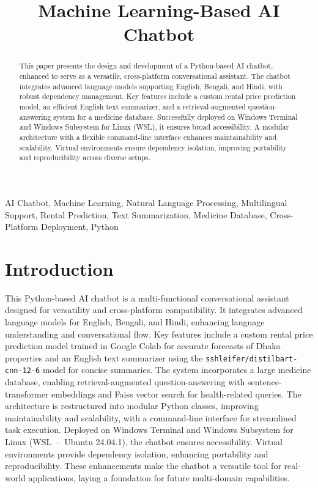 \documentclass[a4paper,10pt,conference]{IEEEtran}
\begin{document}
\title{Machine Learning-Based AI Chatbot}

\author{
}

\maketitle

\begin{abstract}
This paper presents the design and development of a Python-based AI chatbot, enhanced to serve as a versatile, cross-platform conversational assistant. The chatbot integrates advanced language models supporting English, Bengali, and Hindi, with robust dependency management. Key features include a custom rental price prediction model, an efficient English text summarizer, and a retrieval-augmented question-answering system for a medicine database. Successfully deployed on Windows Terminal and Windows Subsystem for Linux (WSL), it ensures broad accessibility. A modular architecture with a flexible command-line interface enhances maintainability and scalability. Virtual environments ensure dependency isolation, improving portability and reproducibility across diverse setups.
\end{abstract}

\begin{IEEEkeywords}
AI Chatbot, Machine Learning, Natural Language Processing, Multilingual Support, Rental Prediction, Text Summarization, Medicine Database, Cross-Platform Deployment, Python
\end{IEEEkeywords}

\section{Introduction}
This Python-based AI chatbot is a multi-functional conversational assistant designed for versatility and cross-platform compatibility. It integrates advanced language models for English, Bengali, and Hindi, enhancing language understanding and conversational flow. Key features include a custom rental price prediction model trained in Google Colab for accurate forecasts of Dhaka properties and an English text summarizer using the \texttt{sshleifer/distilbart-cnn-12-6} model for concise summaries. The system incorporates a large medicine database, enabling retrieval-augmented question-answering with sentence-transformer embeddings and Faiss vector search for health-related queries. The architecture is restructured into modular Python classes, improving maintainability and scalability, with a command-line interface for streamlined task execution. Deployed on Windows Terminal and Windows Subsystem for Linux (WSL~--~Ubuntu 24.04.1), the chatbot ensures accessibility. Virtual environments provide dependency isolation, enhancing portability and reproducibility. These enhancements make the chatbot a versatile tool for real-world applications, laying a foundation for future multi-domain capabilities.
\end{document}
